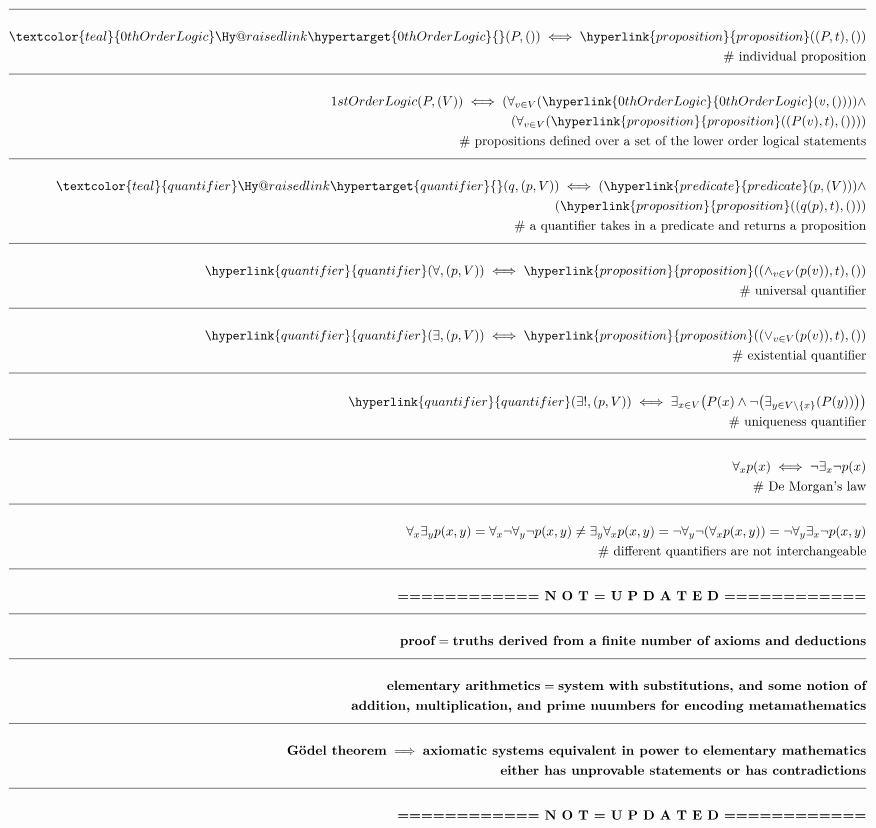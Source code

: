 \documentclass[a4paper]{article}
\makeatletter
\def\ml{\mleft}
\def\mr{\mright}
\newcommand{\melazy}{\textbf{============ N O T = U P D A T E D ============}}
\newcommand{\eqComment}[1]{\text{  \# #1}}
\newcommand{\n}{\\[1.5ex] \hline \nonumber \\[0ex]}
\newcommand{\m}{\nonumber \\}
\newcommand{\labeltarget}[1]{\Hy@raisedlink{\hypertarget{#1}{}}}
\newcommand{\dfn}[1]{\textcolor{teal}{#1}\labeltarget{#1}}
\newcommand{\rfr}[1]{\hyperlink{#1}{#1}}
\makeatother
\begin{document}
\begin{tcolorbox}
\begin{align}
\n \dfn{0thOrderLogic}\ml(P, \ml(\mr)\mr) \iff \rfr{proposition}\ml(\ml(P, t\mr), \ml(\mr)\mr)
\m \eqComment{individual proposition}
\n 1stOrderLogic\ml(P, \ml(V\mr)\mr) \iff \ml(\forall_{v \in V} \ml(\rfr{0thOrderLogic}\ml(v, \ml(\mr)\mr)\mr)\mr) \land
\m \ml(\forall_{v \in V} \ml(\rfr{proposition}\ml(\ml(P\ml(v\mr), t\mr), \ml(\mr)\mr)\mr)\mr)
\m \eqComment{propositions defined over a set of the lower order logical statements}
\n \dfn{quantifier}\ml(q, \ml(p, V\mr)\mr) \iff \ml(\rfr{predicate}\ml(p, \ml(V\mr)\mr)\mr) \land 
\m \ml(\rfr{proposition}\ml(\ml(q\ml(p\mr), t\mr), \ml(\mr)\mr)\mr)
\m \eqComment{a quantifier takes in a predicate and returns a proposition}
\n \rfr{quantifier}\ml(\forall, \ml(p, V\mr)\mr) \iff \rfr{proposition}\ml(\ml(\land_{v \in V} \ml(p\ml(v\mr)\mr), t\mr), \ml(\mr)\mr)
\m \eqComment{universal quantifier}
\n \rfr{quantifier}\ml(\exists, \ml(p, V\mr)\mr) \iff \rfr{proposition}\ml(\ml(\lor_{v \in V} \ml(p\ml(v\mr)\mr), t\mr), \ml(\mr)\mr)
\m \eqComment{existential quantifier}
\n \rfr{quantifier}\ml(\exists!, \ml(p, V\mr)\mr) \iff \exists_{x \in V} \ml(P\ml(x\mr) \land \lnot \ml(\exists_{y \in V \setminus \{x\}} \ml(P\ml(y\mr)\mr)\mr)\mr)
\m \eqComment{uniqueness quantifier}
\n \forall_{x} p\ml(x\mr) \iff \lnot \exists_{x} \lnot p\ml(x\mr)
\m \eqComment{De Morgan's law}
\n \forall_x \exists_y p\ml(x, y\mr) = \forall_x \lnot \forall_y \lnot p\ml(x, y\mr) \neq \exists_y \forall_x p\ml(x, y\mr) = \lnot \forall_y \lnot \ml(\forall_x p\ml(x, y\mr)\mr) = \lnot \forall_y \exists_x \lnot p\ml(x, y\mr)
\m \eqComment{different quantifiers are not interchangeable}
\n \melazy
\n \textbf{proof} = \textbf{truths derived from a finite number of axioms and deductions}
\n \textbf{elementary arithmetics} = \textbf{system with substitutions, and some notion of}
\m \textbf{addition, multiplication, and prime nuumbers for encoding metamathematics}
\n \textbf{G\"odel theorem} \implies \textbf{axiomatic systems equivalent in power to elementary mathematics}
\m \textbf{either has unprovable statements or has contradictions}
\n \melazy
\end{align}
\end{tcolorbox}
\end{document}

